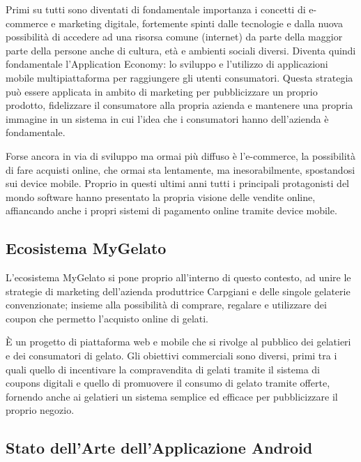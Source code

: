 Primi su tutti sono diventati di fondamentale importanza i concetti di e-commerce e marketing digitale, fortemente spinti dalle tecnologie e dalla nuova possibilità di accedere ad una risorsa comune (internet) da parte della maggior parte della persone anche di cultura, età e ambienti sociali diversi.
Diventa quindi fondamentale l'Application Economy: lo sviluppo e l'utilizzo di applicazioni mobile multipiattaforma per raggiungere gli utenti consumatori.
Questa strategia può essere applicata in ambito di marketing per pubblicizzare un proprio prodotto, fidelizzare il consumatore alla propria azienda e mantenere una propria immagine in un sistema in cui l'idea che i consumatori hanno dell'azienda è fondamentale.

Forse ancora in via di sviluppo ma ormai più diffuso è l'e-commerce, la possibilità di fare acquisti online, che ormai sta lentamente, ma inesorabilmente, spostandosi sui device mobile.
Proprio in questi ultimi anni tutti i principali protagonisti del mondo software hanno presentato la propria visione delle vendite online, affiancando anche i propri sistemi di pagamento online tramite device mobile.

\subsection{Ecosistema MyGelato}

L'ecosistema MyGelato si pone proprio all'interno di questo contesto, ad unire le strategie di marketing dell'azienda produttrice Carpgiani e delle singole gelaterie convenzionate; insieme alla possibilità di comprare, regalare e utilizzare dei coupon che permetto l'acquisto online di gelati.

È un progetto di piattaforma web e mobile che si rivolge al pubblico dei gelatieri e dei consumatori di gelato. Gli obiettivi commerciali sono diversi, primi tra i quali quello di incentivare la compravendita di gelati tramite il sistema di coupons digitali e quello di promuovere il consumo di gelato tramite offerte, fornendo anche ai gelatieri un sistema semplice ed efficace per pubblicizzare il proprio negozio.


\subsection{Stato dell’Arte dell’Applicazione Android}
\newpage